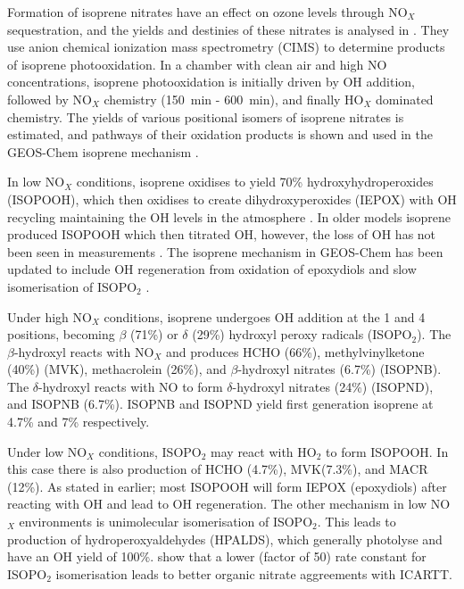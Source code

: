     Formation of isoprene nitrates have an effect on ozone levels through NO$_X$ sequestration, and the yields and destinies of these nitrates is analysed in \citet{Paulot2009a}. 
    They use anion chemical ionization mass spectrometry (CIMS) to determine products of isoprene photooxidation.
    In a chamber with clean air and high NO concentrations, isoprene photooxidation is initially driven by OH addition, followed by NO$_X$ chemistry (150~min - 600~min), and finally HO$_X$ dominated chemistry.
    The yields of various positional isomers of isoprene nitrates is estimated, and pathways of their oxidation products is shown and used in the GEOS-Chem isoprene mechanism \citep{Paulot2009a,Mao2013}. 
    
    In low NO$_X$ conditions, isoprene oxidises to yield 70\% hydroxyhydroperoxides (ISOPOOH), which then oxidises to create dihydroxyperoxides (IEPOX) with OH recycling maintaining the OH levels in the atmosphere \citep{Paulot2009b}.
    In older models isoprene produced ISOPOOH which then titrated OH, however, the loss of OH has not been seen in measurements \citep{Paulot2009b,Mao2013}.
    The isoprene mechanism in GEOS-Chem has been updated to include OH regeneration from oxidation of epoxydiols and slow isomerisation of ISOPO$_2$ \citep{Mao2013}.
    
    Under high NO$_X$ conditions, isoprene undergoes OH addition at the 1 and 4 positions, becoming $\beta$ (71\%) or $\delta$ (29\%) hydroxyl peroxy radicals (ISOPO$_2$). 
    The $\beta$-hydroxyl reacts with NO$_X$ and produces HCHO (66\%), methylvinylketone (40\%) (MVK), methacrolein (26\%), and $\beta$-hydroxyl nitrates (6.7\%) (ISOPNB).
    The $\delta$-hydroxyl reacts with NO to form $\delta$-hydroxyl nitrates (24\%) (ISOPND), and ISOPNB (6.7\%).
    ISOPNB and ISOPND yield first generation isoprene at 4.7\% and 7\% respectively.
    
    Under low NO$_X$ conditions, ISOPO$_2$ may react with HO$_2$ to form ISOPOOH.
    In this case there is also production of HCHO (4.7\%), MVK(7.3\%), and MACR (12\%).
    As stated in earlier; most ISOPOOH will form IEPOX (epoxydiols) after reacting with OH and lead to OH regeneration.
    The other mechanism in low NO$_X$ environments is unimolecular isomerisation of ISOPO$_2$.
    This leads to production of hydroperoxyaldehydes (HPALDS), which generally photolyse and have an OH yield of 100\%.
    \citet{Mao2013} show that a lower (factor of 50) rate constant for ISOPO$_2$ isomerisation leads to better organic nitrate aggreements with ICARTT. 
    
